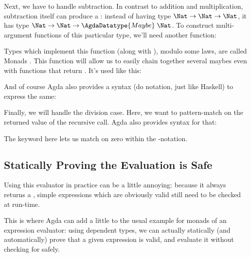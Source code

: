 Next, we have to handle subtraction.
In contrast to addition and multiplication, subtraction itself can produce a
: instead of having type
\(\Nat\rightarrow\Nat\rightarrow\Nat\), it has type 
\(\Nat\rightarrow\Nat\rightarrow\AgdaDatatype{Maybe}\;\Nat\).
To construct multi-argument functions of this particular type, we'll need
another function:
\begin{agdalisting}
\end{agdalisting}
Types which implement this function (along with ), modulo
some laws, are called Monads \citep{moggiNotionsComputationMonads1991a}.
This function will allow us to easily chain together several maybes even with
functions that return .
It's used like this:
\begin{agdalisting*}
\end{agdalisting*}
And of course Agda also provides a syntax (do notation, just like Haskell) to
express the same:
\begin{agdalisting*}
\end{agdalisting*}

Finally, we will handle the division case.
Here, we want to pattern-match on the returned value of the recursive call.
Agda also provides syntax for that:
\begin{agdalisting*}
\end{agdalisting*}
The  keyword here lets us match on zero within the
-notation.
\subsection{Statically Proving the Evaluation is Safe}
Using this evaluator in practice can be a little annoying:
because it always returns a , simple expressions which are
obviously valid still need to be checked at run-time.
\begin{agdalisting*}
\end{agdalisting*}
This is where Agda can add a little to the usual example for monads of an
expression evaluator: using dependent types, we can actually statically (and
automatically) prove that a given expression is valid, and evaluate it without
checking for  safely.

